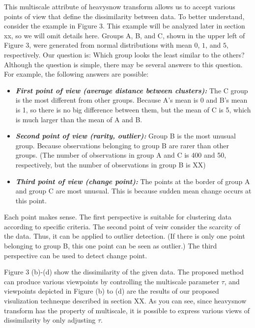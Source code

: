 \documentclass[preprint, review, 12pt]{article}
\theoremstyle{definition}
\theoremstyle{remark}
\begin{document}
This multiscale attribute of heavysnow transform allows us to accept various points of view that define the dissimilarity between data. To better understand, consider the example in Figure 3. This example will be analyzed later in section xx, so we will omit details here. Groups A, B, and C, shown in the upper left of Figure 3, were generated from normal distributions with mean $0$, $1$, and $5$, respectively. Our question is:  
 Which group looks the least similar to the others? Although the question is simple, there may be several answers to this question. For example, the following answers are possible:
\begin{itemize}
\item \textbf{\it First point of view (average distance between clusters):} The C group is the most different from other groups. Because A's mean is 0 and B's mean is 1, so there is no big difference between them, but the mean of C is 5, which is much larger than the mean of A and B.
\item \textbf{\it Second point of view (rarity, outlier):} Group B is the most unusual group. Because observations belonging to group B are rarer than other groups. (The number of observations in group A and C is 400 and 50, respectively, but the number of observations in group B is XX)
\item \textbf{\it Third point of view (change point):} The points at the border of group A and group C are most unusual. This is because  sudden mean change occurs at this point.
\end{itemize}
Each point makes sense. The first perspective is suitable for clustering data according to specific criteria. The second point of veiw consider the scarcity of the data. Thus, it can be applied to outlier detection. (If there is only one point belonging to group B, this one point can be seen as outlier.) The third perspective can be used to detect change point. 

Figure 3 (b)-(d) show the dissimilarity of the given data. The proposed method can produce various viewpoints by controlling the multiscale parameter $\tau$,  and viewpoints depicted in Figure (b) to (d) are the results of our proposed visulization techneque described in section XX. As you can see, since heavysnow transform has the property of multiscale, it is possible to express various views of dissimilarity by only adjusting $\tau$.
\end{document}
